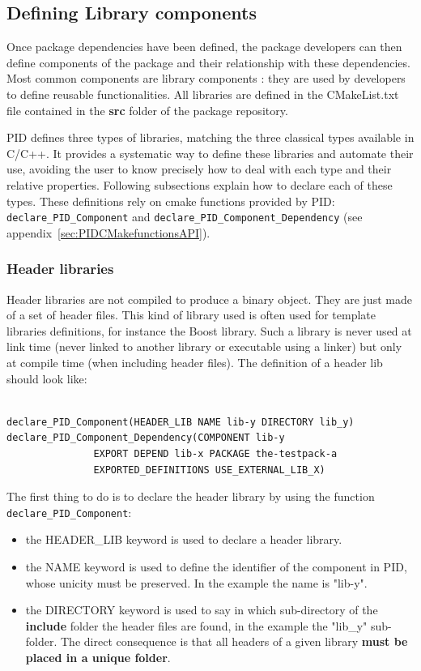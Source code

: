\documentclass[12pt,a4paper]{article}
\begin{document}
\subsection{Defining Library components}
\label{sec:libCMake}

Once package dependencies have been defined, the package developers can then define components of the package and their relationship with these dependencies. Most common components are library components : they are used by developers to define reusable functionalities. All libraries are defined in the CMakeList.txt file contained in the \textbf{src} folder of the package repository.

PID defines three types of libraries, matching the three classical  types available in C/C++. It provides a systematic way to define these libraries and automate their use, avoiding the user to know precisely how to deal with each type and their relative properties. Following subsections explain how to declare each of these types. These definitions rely on cmake functions provided by PID: \texttt{declare\_PID\_Component} and \texttt{declare\_PID\_Component\_Dependency} (see appendix~\ref{sec:PIDCMakefunctionsAPI}).

\subsubsection{Header libraries}
\label{sec:libCMakeHeader}

Header libraries are not compiled to produce a binary object. They are just made of a set of header files. This kind of library used is often used for template libraries definitions, for instance the Boost library. Such a library is never used at link time (never linked to another library or executable using a linker) but only at compile time (when including header files). The definition of a header lib should look like:
\begin{verbatim}

declare_PID_Component(HEADER_LIB NAME lib-y DIRECTORY lib_y)
declare_PID_Component_Dependency(COMPONENT lib-y 
               EXPORT DEPEND lib-x PACKAGE the-testpack-a
               EXPORTED_DEFINITIONS USE_EXTERNAL_LIB_X)

\end{verbatim}

The first thing to do is to declare the header library by using the function \texttt{declare\_PID\_Component}:
\begin{itemize}
\item the HEADER\_LIB keyword is used to declare a header library.
\item the NAME keyword is used to define the identifier of the component in PID, whose unicity must be preserved. In the example the name is "lib-y".
\item the DIRECTORY keyword is used to say in which sub-directory of the \textbf{include} folder the header files are found, in the example the "lib\_y" sub-folder. The direct consequence is that all headers of a given library \textbf{must be placed in a unique folder}.
\end{itemize}
 
\end{document}
